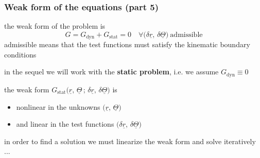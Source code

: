 \begin{frame}
  \frametitle{Weak form of the equations (part 5)}
  
  the weak form of the problem is
  \begin{displaymath}
    G = G_{\text{dyn}} + G_{\text{stat}} = 0
    \quad \forall \bigl( \delta \underline{r} , \, \delta \underline{\Theta} \bigr) \: \text{admissible}
  \end{displaymath}
  admissible means that the test functions must satisfy the kinematic boundary conditions
  
  \vspace{1em}
  in the sequel we will work with the \textbf{static problem}, i.e. we assume $G_{\text{dyn}} \equiv 0$
  
  \vspace{0.5em}
  the weak form $G_{\text{stat}} \bigl( \underline{r} , \, \underline{\Theta} \, ; \, \delta \underline{r} , \, \delta \underline{\Theta} \bigr)$ is 
  \begin{itemize}
    \item nonlinear in the unknowns $\bigl( \underline{r} , \, \underline{\Theta} \bigr)$
    \item and linear in the test functions $\bigl( \delta \underline{r} , \, \delta \underline{\Theta} \bigr)$
  \end{itemize}
  
  \vspace{0.5em}
  in order to find a solution we must linearize the weak form and solve iteratively ...

\end{frame}


